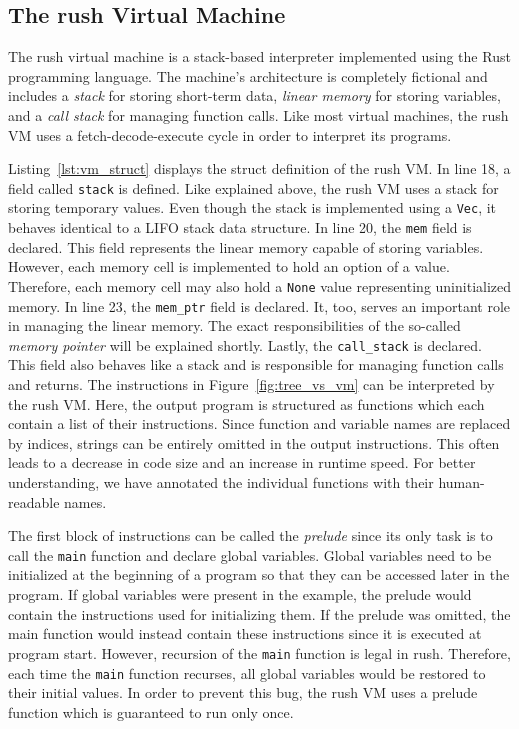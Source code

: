 \subsection{The rush Virtual Machine}

The rush virtual machine is a stack-based interpreter implemented using the Rust programming language.
The machine's architecture is completely fictional and includes a \emph{stack} for storing short-term data, \emph{linear memory} for storing variables, and a \emph{call stack} for managing function calls.
Like most virtual machines, the rush VM uses a fetch-decode-execute cycle in order to interpret its programs.


Listing~\ref{lst:vm_struct} displays the struct definition of the rush VM\@.
In line 18, a field called \texttt{stack} is defined.
Like explained above, the rush VM uses a stack for storing temporary values.
Even though the stack is implemented using a \texttt{Vec}, it behaves identical to a LIFO stack data structure.
In line 20, the \texttt{mem} field is declared.
This field represents the linear memory capable of storing variables.
However, each memory cell is implemented to hold an option of a value.
Therefore, each memory cell may also hold a \texttt{None} value representing uninitialized memory.
In line 23, the \texttt{mem\_ptr} field is declared.
It, too, serves an important role in managing the linear memory.
The exact responsibilities of the so-called \emph{memory pointer} will be explained shortly.
Lastly, the \texttt{call\_stack} is declared.
This field also behaves like a stack and is responsible for managing function calls and returns.
The instructions in Figure~\ref{fig:tree_vs_vm} can be interpreted by the rush VM\@.
Here, the output program is structured as functions which each contain a list of their instructions.
Since function and variable names are replaced by indices, strings can be entirely omitted in the output instructions.
This often leads to a decrease in code size and an increase in runtime speed.
For better understanding, we have annotated the individual functions with their human-readable names.

The first block of instructions can be called the \emph{prelude} since its only task is to call the \texttt{main} function and declare global variables.
Global variables need to be initialized at the beginning of a program so that they can be accessed later in the program.
If global variables were present in the example, the prelude would contain the instructions used for initializing them.
If the prelude was omitted, the main function would instead contain these instructions since it is executed at program start.
However, recursion of the \texttt{main} function is legal in rush.
Therefore, each time the \texttt{main} function recurses, all global variables would be restored to their initial values.
In order to prevent this bug, the rush VM uses a prelude function which is guaranteed to run only once.

